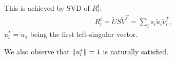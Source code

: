 \begin{enumerate}
\begin{enumerate}
                This is achieved by SVD of $R_l^t$:
                \begin{align*}
                    R_l^t = \tilde U S\tilde V^T = \sum_i s_i \tilde u_i \tilde v_i^T,
                \end{align*}
                $u_l^* = \tilde u_1$ being the first left-singular vector. 
                
                We also observe that $\left\lVert u_l^*\right\rVert =1$ is naturally satisfied.
        \end{enumerate}
\end{enumerate}








































